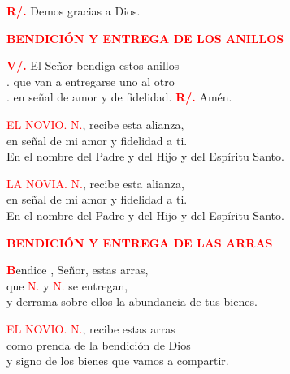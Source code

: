 \documentclass[12pt, letterpaper, spanish]{report}
\begin{document}
\Large \hspace{-0.9cm} {\bfseries \textcolor{red}{R/.}} \hspace{0.5cm} Demos gracias a Dios. \newline

\Large {\bfseries \textcolor{red}{BENDICI\'ON Y ENTREGA DE LOS ANILLOS}} \newline

\Large \hspace{-0.9cm} {\bfseries \textcolor{red}{V/.}} \hspace{0.5cm} El Se\~nor bendiga \Huge \textcolor{red}{} \Large estos anillos \\
.\hspace{1.5cm} que van a entregarse uno al otro \\
.\hspace{1.5cm} en se\~nal de amor y de fidelidad. \newline
\Large {\bfseries \textcolor{red}{R/.}} \hspace{0.5cm}  Am\'en. \newline

\textcolor{red}{EL NOVIO.} \newline
\textcolor{red}{N.}, recibe esta alianza, \\
en se\~nal de mi amor y fidelidad a ti. \\
En el nombre del Padre y del Hijo y del Esp\'iritu Santo. \newline

\textcolor{red}{LA NOVIA.} \newline
\textcolor{red}{N.}, recibe esta alianza, \\
en se\~nal de mi amor y fidelidad a ti. \\
En el nombre del Padre y del Hijo y del Esp\'iritu Santo. \newline

\Large {\bfseries \textcolor{red}{BENDICI\'ON Y ENTREGA DE LAS ARRAS}}

\lettrine[lines=1]{\bfseries \textcolor{red}{B}}{}endice \Huge \textcolor{red}{},  \Large Se\~nor, estas arras, \\
que \textcolor{red}{N.} y \textcolor{red}{N.} se entregan, \\
y derrama sobre ellos la abundancia de tus bienes. \newline

\textcolor{red}{EL NOVIO.} \newline
\textcolor{red}{N.}, recibe estas arras \\
como prenda de la bendici\'on de Dios \\
y signo de los bienes que vamos a compartir. \newline
\end{document}
